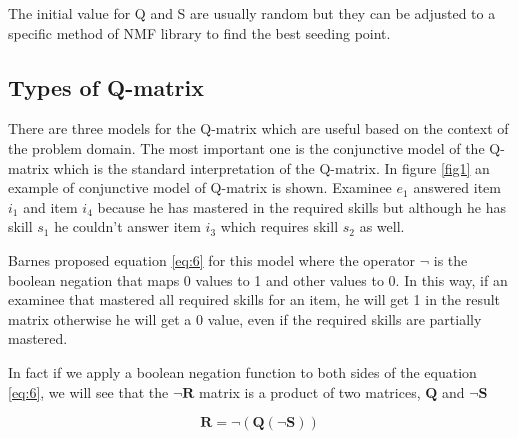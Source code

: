 The initial value for Q and S are usually random but they can be adjusted to a specific method of \ac{NMF} library to find the best seeding point.


\subsection{Types of Q-matrix}

There are three models for the Q-matrix which are useful based on the context of the problem domain. The most important one is the conjunctive model of the Q-matrix which is the standard interpretation of the Q-matrix. In figure \ref{fig1} an example of conjunctive model of Q-matrix is shown. Examinee $e_{1}$ answered item $i_{1}$ and item $i_{4}$ because he has mastered in the required skills but although he has skill $s_{1}$ he couldn't answer item $i_{3}$ which requires skill $s_{2}$ as well.

Barnes \citep{Barnes2005} proposed equation \ref{eq:6} for this model where the operator $\neg$ is the boolean negation that maps 0 values to 1 and other values to 0. In this way, if an examinee that mastered all required skills for an item, he will get 1 in the result matrix otherwise he will get a 0 value, even if the required skills are partially mastered.

In fact if we apply a boolean negation function to both sides of the equation \ref{eq:6}, we will see that the $\neg\mathbf{R}$ matrix is a product of two matrices, $\mathbf{Q}$ and $\neg\mathbf{S}$

\begin{equation}
\mathbf{R}=\neg\left(\mathbf{Q}\left(\neg\mathbf{S}\right)\right)\label{eq:6}
\end{equation}


